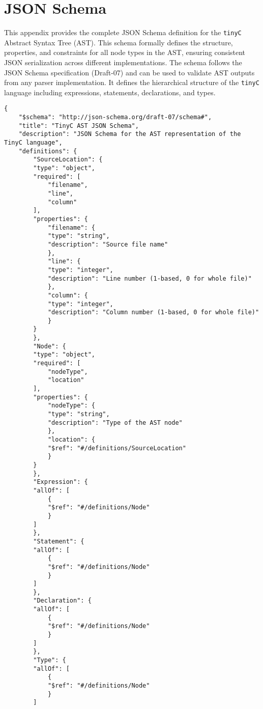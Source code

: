 \chapter{JSON Schema}
\label{appendix-b}
This appendix provides the complete JSON Schema definition for the \texttt{tinyC} Abstract Syntax Tree (AST). This schema formally defines the structure, properties, and constraints for all node types in the AST, ensuring consistent JSON serialization across different implementations.
The schema follows the JSON Schema specification (Draft-07) and can be used to validate AST outputs from any parser implementation. It defines the hierarchical structure of the \texttt{tinyC} language including expressions, statements, declarations, and types.




\begin{lstlisting}
{
    "$schema": "http://json-schema.org/draft-07/schema#",
    "title": "TinyC AST JSON Schema",
    "description": "JSON Schema for the AST representation of the TinyC language",
    "definitions": {
        "SourceLocation": {
        "type": "object",
        "required": [
            "filename",
            "line",
            "column"
        ],
        "properties": {
            "filename": {
            "type": "string",
            "description": "Source file name"
            },
            "line": {
            "type": "integer",
            "description": "Line number (1-based, 0 for whole file)"
            },
            "column": {
            "type": "integer",
            "description": "Column number (1-based, 0 for whole file)"
            }
        }
        },
        "Node": {
        "type": "object",
        "required": [
            "nodeType",
            "location"
        ],
        "properties": {
            "nodeType": {
            "type": "string",
            "description": "Type of the AST node"
            },
            "location": {
            "$ref": "#/definitions/SourceLocation"
            }
        }
        },
        "Expression": {
        "allOf": [
            {
            "$ref": "#/definitions/Node"
            }
        ]
        },
        "Statement": {
        "allOf": [
            {
            "$ref": "#/definitions/Node"
            }
        ]
        },
        "Declaration": {
        "allOf": [
            {
            "$ref": "#/definitions/Node"
            }
        ]
        },
        "Type": {
        "allOf": [
            {
            "$ref": "#/definitions/Node"
            }
        ]

\end{lstlisting}
